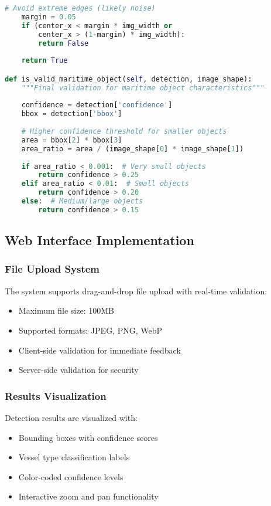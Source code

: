 \documentclass[a4paper,11pt]{article}
\begin{document}
\begin{lstlisting}[language=Python, caption=Advanced Maritime Context Filter]
    # Avoid extreme edges (likely noise)
    margin = 0.05
    if (center_x < margin * img_width or 
        center_x > (1-margin) * img_width):
        return False
        
    return True

def is_valid_maritime_object(self, detection, image_shape):
    """Final validation for maritime object characteristics"""
    
    confidence = detection['confidence']
    bbox = detection['bbox']
    
    # Higher confidence threshold for smaller objects
    area = bbox[2] * bbox[3]
    area_ratio = area / (image_shape[0] * image_shape[1])
    
    if area_ratio < 0.001:  # Very small objects
        return confidence > 0.25
    elif area_ratio < 0.01:  # Small objects  
        return confidence > 0.20
    else:  # Medium/large objects
        return confidence > 0.15
\end{lstlisting}

\subsection{Web Interface Implementation}

\subsubsection{File Upload System}
The system supports drag-and-drop file upload with real-time validation:
\begin{itemize}
    \item Maximum file size: 100MB
    \item Supported formats: JPEG, PNG, WebP
    \item Client-side validation for immediate feedback
    \item Server-side validation for security
\end{itemize}

\subsubsection{Results Visualization}
Detection results are visualized with:
\begin{itemize}
    \item Bounding boxes with confidence scores
    \item Vessel type classification labels
    \item Color-coded confidence levels
    \item Interactive zoom and pan functionality
\end{itemize}
\end{document}
